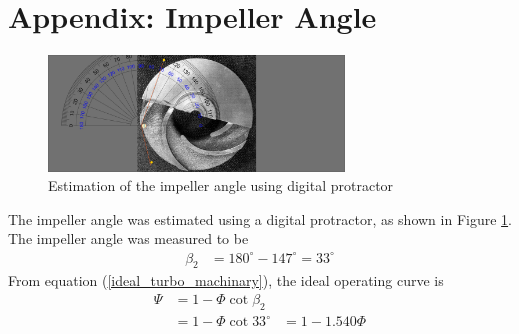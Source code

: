 \section{Appendix: Impeller Angle}
\label{sec:impeller_angle}
\begin{figure}[h]
    \centering
    \includegraphics[width=0.7\textwidth]{Sections/Figures/Impeller Angle.jpg}
    \caption{Estimation of the impeller angle using digital protractor}
    \label{fig:impeller_angle}
\end{figure}
The impeller angle was estimated using a digital protractor, as shown in Figure \ref{fig:impeller_angle}. The impeller angle was measured to be 
\begin{align*}
    \beta_2 &= 180^\circ - 147^\circ = 33^\circ
\end{align*}
From equation (\ref{ideal_turbo_machinary}), the ideal operating curve is
\begin{align*}
    \Psi &= 1 - \Phi \cot{\beta_2} \\
    &= 1 - \Phi \cot{33^\circ}
    &= 1 - 1.540 \Phi
\end{align*}